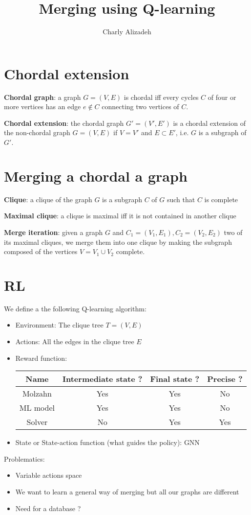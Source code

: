 \documentclass{article}
\title{Merging using Q-learning}
\author{Charly Alizadeh}
\date{}
\begin{document}
\maketitle

\section{Chordal extension}

\textbf{Chordal graph}: a graph \(G=(V, E)\) is chordal iff every cycles \(C\) of four or more vertices has an edge \(e \notin C\) connecting two vertices of \(C\).


\noindent \textbf{Chordal extension}: the chordal graph \(G'=(V', E')\) is a chordal extension of the non-chordal graph \(G=(V, E)\) if \(V = V'\) and \(E \subset E'\), i.e. \(G\) is a subgraph of \(G'\).

\section{Merging a chordal a graph}

\textbf{Clique}: a clique of the graph \(G\) is a subgraph \(C\) of \(G\) such that \(C\) is complete

\noindent \textbf{Maximal clique}: a clique is maximal iff it is not contained in another clique

\noindent \textbf{Merge iteration}: given a graph \(G\) and \(C_1=(V_1, E_1), C_2=(V_2, E_2)\) two of its maximal cliques, we merge them into one clique by making the subgraph composed of the vertices \(V=V_1 \cup V_2\) complete.

\section{RL}

We define a the following Q-learning algorithm:
\begin{itemize}
    \item Environment: The clique tree \(T=(V, E)\)
    \item Actions: All the edges in the clique tree \(E\)
    \item Reward function:\\
        \begin{tabular}{|c|c|c|c|}
            \hline
            Name & Intermediate state ? & Final state ? & Precise ?\\
            \hline
            Molzahn & Yes & Yes & No\\
            ML model & Yes & Yes & No\\
            Solver & No & Yes & Yes\\
            \hline
        \end{tabular}
    \item State or State-action function (what guides the policy): GNN
\end{itemize}

\noindent Problematics:
\begin{itemize}
    \item Variable actions space
    \item We want to learn a general way of merging but all our graphs are different
    \item Need for a database ?
\end{itemize}
\end{document}
